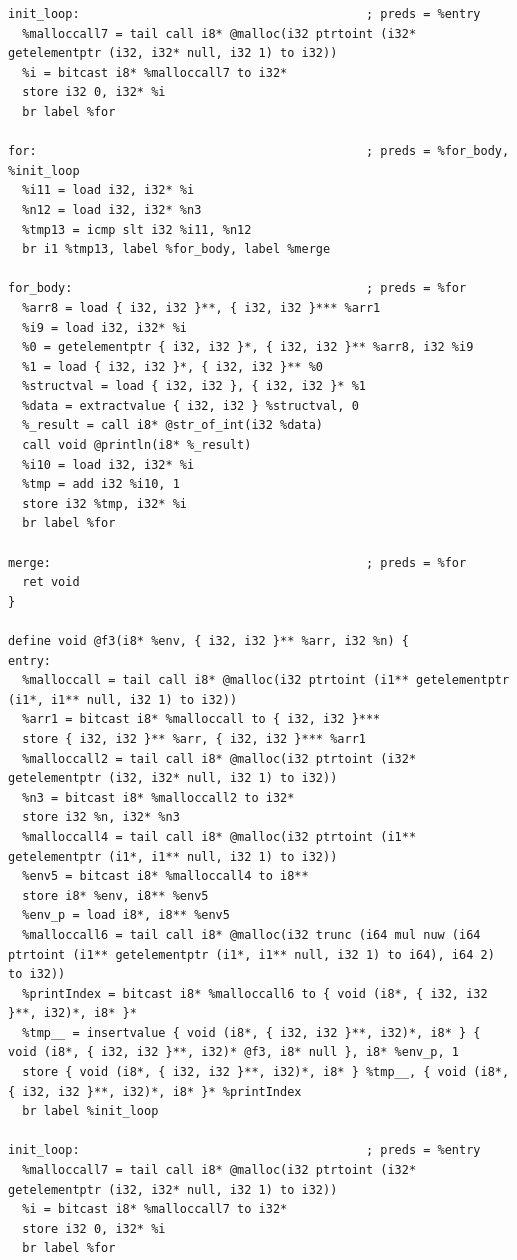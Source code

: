 \documentclass[12pt]{article}
\begin{document}
\begin{mdframed}[hidealllines=true,backgroundcolor=green!10]
\begin{lstlisting}
init_loop:                                        ; preds = %entry
  %malloccall7 = tail call i8* @malloc(i32 ptrtoint (i32* getelementptr (i32, i32* null, i32 1) to i32))
  %i = bitcast i8* %malloccall7 to i32*
  store i32 0, i32* %i
  br label %for

for:                                              ; preds = %for_body, %init_loop
  %i11 = load i32, i32* %i
  %n12 = load i32, i32* %n3
  %tmp13 = icmp slt i32 %i11, %n12
  br i1 %tmp13, label %for_body, label %merge

for_body:                                         ; preds = %for
  %arr8 = load { i32, i32 }**, { i32, i32 }*** %arr1
  %i9 = load i32, i32* %i
  %0 = getelementptr { i32, i32 }*, { i32, i32 }** %arr8, i32 %i9
  %1 = load { i32, i32 }*, { i32, i32 }** %0
  %structval = load { i32, i32 }, { i32, i32 }* %1
  %data = extractvalue { i32, i32 } %structval, 0
  %_result = call i8* @str_of_int(i32 %data)
  call void @println(i8* %_result)
  %i10 = load i32, i32* %i
  %tmp = add i32 %i10, 1
  store i32 %tmp, i32* %i
  br label %for

merge:                                            ; preds = %for
  ret void
}

define void @f3(i8* %env, { i32, i32 }** %arr, i32 %n) {
entry:
  %malloccall = tail call i8* @malloc(i32 ptrtoint (i1** getelementptr (i1*, i1** null, i32 1) to i32))
  %arr1 = bitcast i8* %malloccall to { i32, i32 }***
  store { i32, i32 }** %arr, { i32, i32 }*** %arr1
  %malloccall2 = tail call i8* @malloc(i32 ptrtoint (i32* getelementptr (i32, i32* null, i32 1) to i32))
  %n3 = bitcast i8* %malloccall2 to i32*
  store i32 %n, i32* %n3
  %malloccall4 = tail call i8* @malloc(i32 ptrtoint (i1** getelementptr (i1*, i1** null, i32 1) to i32))
  %env5 = bitcast i8* %malloccall4 to i8**
  store i8* %env, i8** %env5
  %env_p = load i8*, i8** %env5
  %malloccall6 = tail call i8* @malloc(i32 trunc (i64 mul nuw (i64 ptrtoint (i1** getelementptr (i1*, i1** null, i32 1) to i64), i64 2) to i32))
  %printIndex = bitcast i8* %malloccall6 to { void (i8*, { i32, i32 }**, i32)*, i8* }*
  %tmp__ = insertvalue { void (i8*, { i32, i32 }**, i32)*, i8* } { void (i8*, { i32, i32 }**, i32)* @f3, i8* null }, i8* %env_p, 1
  store { void (i8*, { i32, i32 }**, i32)*, i8* } %tmp__, { void (i8*, { i32, i32 }**, i32)*, i8* }* %printIndex
  br label %init_loop

init_loop:                                        ; preds = %entry
  %malloccall7 = tail call i8* @malloc(i32 ptrtoint (i32* getelementptr (i32, i32* null, i32 1) to i32))
  %i = bitcast i8* %malloccall7 to i32*
  store i32 0, i32* %i
  br label %for


\end{lstlisting}
\end{mdframed}
\end{document}
